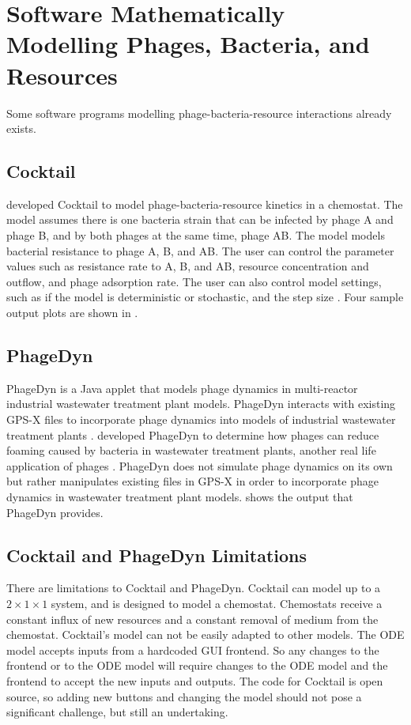 \section{Software Mathematically Modelling Phages, Bacteria, and Resources}
Some software programs modelling phage-bacteria-resource interactions already exists. 
\subsection{Cocktail}
\citet{nilssonCocktailComputerProgram2022} developed Cocktail to model phage-bacteria-resource kinetics in a chemostat. 
The model assumes there is one bacteria strain that can be infected by phage A and phage B, and by both phages at the same time, phage AB. 
The model models bacterial resistance to phage A, B, and AB. 
The user can control the parameter values such as resistance rate to A, B, and AB, resource concentration and outflow, and phage adsorption rate. 
The user can also control model settings, such as if the model is deterministic or stochastic, and the step size \cite{nilssonCocktailComputerProgram2022}. 
Four sample output plots are shown in . 

\subsection{PhageDyn}
PhageDyn is a Java applet that models phage dynamics in multi-reactor industrial wastewater treatment plant models. 
PhageDyn interacts with existing GPS-X \cite{AdvancedWastewaterModelling} files to incorporate phage dynamics into models of industrial wastewater treatment plants \cite{krysiak-baltynSimulationPhageDynamics2017}. 
\citet{krysiak-baltynSimulationPhageDynamics2017} developed PhageDyn to determine how phages can reduce foaming caused by bacteria in wastewater treatment plants, another real life application of phages \cite{heardEffectFilamentousBacteria2008}. 
PhageDyn does not simulate phage dynamics on its own but rather manipulates existing files in GPS-X in order to incorporate phage dynamics in wastewater treatment plant models. 
 shows the output that PhageDyn provides. 

\subsection{Cocktail and PhageDyn Limitations}
\label{sec:literature:cocktail_and_phagedyn_limitations}
There are limitations to Cocktail and PhageDyn. 
Cocktail can model up to a $2\times 1 \times 1$ system, and is designed to model a chemostat. 
Chemostats receive a constant influx of new resources and a constant removal of medium from the chemostat. 
Cocktail's model can not be easily adapted to other models. 
The ODE model accepts inputs from a hardcoded GUI frontend. 
So any changes to the frontend or to the ODE model will require changes to the ODE model and the frontend to accept the new inputs and outputs. 
The code for Cocktail is open source, so adding new buttons and changing the model should not pose a significant challenge, but still an undertaking. 

